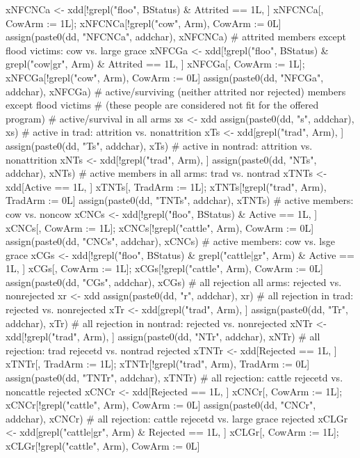 \begin{Schunk}
\begin{Sinput}
{{    xNFCNCa <- xdd[!grepl("floo", BStatus) & Attrited == 1L, ]
    xNFCNCa[, CowArm := 1L]; xNFCNCa[!grepl("cow", Arm), CowArm := 0L]
    assign(paste0(dd, "NFCNCa", addchar), xNFCNCa)
    # attrited members except flood victims: cow vs. large grace
    xNFCGa <- xdd[!grepl("floo", BStatus) & grepl("cow|gr", Arm) & Attrited == 1L, ]
    xNFCGa[, CowArm := 1L]; xNFCGa[!grepl("cow", Arm), CowArm := 0L]
    assign(paste0(dd, "NFCGa", addchar), xNFCGa)
    # active/surviving (neither attrited nor rejected) members except flood victims 
    # (these people are considered not fit for the offered program)
    # active/survival in all arms
    xs <- xdd
    assign(paste0(dd, "s", addchar), xs)
    # active in trad: attrition vs. nonattrition
    xTs <- xdd[grepl("trad", Arm), ]
    assign(paste0(dd, "Ts", addchar), xTs)
    # active in nontrad: attrition vs. nonattrition
    xNTs <- xdd[!grepl("trad", Arm), ]
    assign(paste0(dd, "NTs", addchar), xNTs)
    # active members in all arms: trad vs. nontrad
    xTNTs <- xdd[Active == 1L, ]
    xTNTs[, TradArm := 1L]; xTNTs[!grepl("trad", Arm), TradArm := 0L]
    assign(paste0(dd, "TNTs", addchar), xTNTs)
    # active members: cow vs. noncow
    xCNCs <- xdd[!grepl("floo", BStatus) & Active == 1L, ]
    xCNCs[, CowArm := 1L]; xCNCs[!grepl("cattle", Arm), CowArm := 0L]
    assign(paste0(dd, "CNCs", addchar), xCNCs)
    # active members: cow vs. lsge grace
    xCGs <- xdd[!grepl("floo", BStatus) & grepl("cattle|gr", Arm) & Active == 1L, ]
    xCGs[, CowArm := 1L]; xCGs[!grepl("cattle", Arm), CowArm := 0L]
    assign(paste0(dd, "CGs", addchar), xCGs)
    # all rejection all arms: rejected vs. nonrejected
    xr <- xdd
    assign(paste0(dd, "r", addchar), xr)
    # all rejection in trad: rejected vs. nonrejected
    xTr <- xdd[grepl("trad", Arm), ]
    assign(paste0(dd, "Tr", addchar), xTr)
    # all rejection in nontrad: rejected vs. nonrejected
    xNTr <- xdd[!grepl("trad", Arm), ]
    assign(paste0(dd, "NTr", addchar), xNTr)
    # all rejection: trad rejecetd vs. nontrad rejected
    xTNTr <- xdd[Rejected == 1L, ]
    xTNTr[, TradArm := 1L]; xTNTr[!grepl("trad", Arm), TradArm := 0L]
    assign(paste0(dd, "TNTr", addchar), xTNTr)
    # all rejection: cattle rejecetd vs. noncattle rejected
    xCNCr <- xdd[Rejected == 1L, ]
    xCNCr[, CowArm := 1L]; xCNCr[!grepl("cattle", Arm), CowArm := 0L]
    assign(paste0(dd, "CNCr", addchar), xCNCr)
    # all rejection: cattle rejecetd vs. large grace rejected
    xCLGr <- xdd[grepl("cattle|gr", Arm) & Rejected == 1L, ]
    xCLGr[, CowArm := 1L]; xCLGr[!grepl("cattle", Arm), CowArm := 0L]
}}
\end{Sinput}
\end{Schunk}
